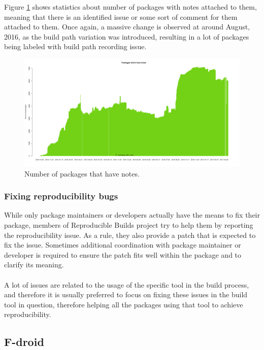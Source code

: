 {Figure \ref{fig:stats_notes} shows statistics about number of packages with notes attached to them, meaning that there is an identified issue or some sort of comment for them attached to them. Once again, a massive change is observed at around August, 2016, as the build path variation was introduced, resulting in a lot of packages being labeled with build path recording issue.\\
\FloatBarrier

\begin{figure}[h]
\centering
\includegraphics[width=1.05\textwidth]{fig/stats_notes.png}
\caption{\label{fig:stats_notes}Number of packages that have notes. \autocite{tests-rbo}}
\end{figure}
\subsubsection[Fixing reproducibility bugs]{Fixing reproducibility bugs}
While only package maintainers or developers actually have the means to fix their package, members of Reproducible Builds project try to help them by reporting the reproducibility issue. As a rule, they also provide a patch that is expected to fix the issue. Sometimes additional coordination with package maintainer or developer is required to ensure the patch fits well within the package and to clarify its meaning.\\\\
A lot of issues are related to the usage of the specific tool in the build process, and therefore it is usually preferred to focus on fixing these issues in the build tool in question, therefore helping all the packages using that tool to achieve reproducibility.

}
\subsection[F-droid]{F-droid}
